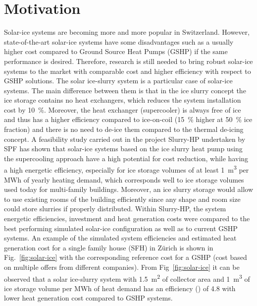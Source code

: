 \documentclass[english]{SFOEYearlyReportEnglish_2018}
\begin{document}
 

%


\section{Motivation}

Solar-ice systems are becoming more and more popular in Switzerland. However, state-of-the-art solar-ice systems have some disadvantages such as a usually higher cost compared to Ground Source Heat Pumps (GSHP) if the same performance is desired. Therefore, research is still needed to bring robust solar-ice systems to the market with comparable cost and higher efficiency with respect to GSHP solutions. 
The solar ice-slurry system is a particular case of solar-ice systems. The main difference between them is that in the ice slurry concept the ice storage contains no heat exchangers, which reduces the system installation cost by 10~\%. Moreover, the heat exchanger (supercooler) is always free of ice and thus has a higher efficiency compared to ice-on-coil (15~\% higher at 50~\% ice fraction) and there is no need to de-ice them compared to the thermal de-icing concept. A feasibility study carried out in the project Slurry-HP undertaken by SPF \citep{SlurryHp_2017} has shown that solar-ice systems based on the ice slurry heat pump using the supercooling approach have a high potential for cost reduction, while having a high energetic efficiency, especially for ice storage volumes of at least \SI{1}{m^3} per MWh of yearly heating demand, which corresponds well to ice storage volumes used today for multi-family buildings. Moreover, an ice slurry storage would allow to use existing rooms of the building efficiently since any shape and room size could store slurries if properly distributed.
Within Slurry-HP, the system energetic efficiencies, investment and heat generation costs were compared to the best performing simulated solar-ice configuration as well as to current GSHP systems. An example of the simulated system efficiencies and estimated heat generation cost for a single family house (SFH) in Zürich is shown in Fig.~\ref{fig:solar-ice} with the corresponding reference cost for a GSHP (cost based on multiple offers from different companies). From Fig~\ref{fig:solar-ice} it can be observed that a solar ice-slurry system with \SI{1.5}{m^2} of collector area and \SI{1}{m^3} of ice storage volume per MWh of heat demand has an efficiency (\si{\spf}) of 4.8 with lower heat generation cost compared to GSHP systems.
\end{document}
